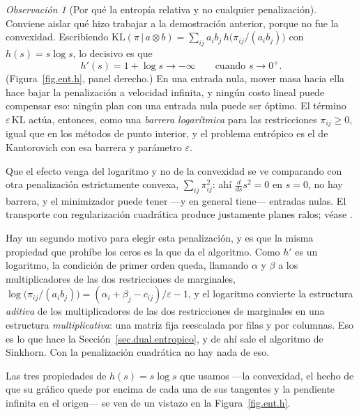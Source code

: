\documentclass[12pt, a4paper]{amsbook}
\theoremstyle{remark}
\newtheorem{obs}[teo]{Observación}
\theoremstyle{definition}
\numberwithin{section}{chapter}
\numberwithin{subsection}{section}
\numberwithin{equation}{section}
\numberwithin{figure}{chapter}
\begin{document}
\begin{obs}[Por qué la entropía relativa y no cualquier penalización]\label{obs.por.que.KL}
Conviene aislar qué hizo trabajar a la demostración anterior, porque no fue
la convexidad. Escribiendo
$\mathrm{KL}(\pi\,|\,a\otimes b)=\sum_{ij}a_ib_j\,h\bigl(\pi_{ij}/(a_ib_j)\bigr)$
con $h(s)=s\log s$, lo decisivo es que
\[
h'(s)=1+\log s\longrightarrow-\infty\qquad\text{cuando }s\to0^+ .
\]
(Figura~\ref{fig.ent.h}, panel derecho.)
En una entrada nula, mover masa hacia ella hace bajar la penalización a
velocidad infinita, y ningún costo lineal puede compensar eso: ningún plan
con una entrada nula puede ser óptimo. El término
$\varepsilon\,\mathrm{KL}$ actúa, entonces, como una \emph{barrera
logarítmica} para las restricciones $\pi_{ij}\ge0$, igual que en los métodos
de punto interior, y el problema entrópico es el de Kantorovich con esa
barrera y parámetro $\varepsilon$.

Que el efecto venga del logaritmo y no de la convexidad se ve comparando con
otra penalización estrictamente convexa, $\sum_{ij}\pi_{ij}^2$: ahí
$\frac{d}{ds}s^2=0$ en $s=0$, no hay barrera, y el minimizador puede tener
—y en general tiene— entradas nulas. El transporte con regularización
cuadrática produce justamente planes ralos; véase
\cite{BlondelSeguyRolet2018}.

Hay un segundo motivo para elegir esta penalización, y es que la misma
propiedad que prohíbe los ceros es la que da el algoritmo. Como $h'$ es un
logaritmo, la condición de primer orden queda, llamando $\alpha$ y $\beta$ a
los multiplicadores de las dos restricciones de marginales,
$\log\bigl(\pi_{ij}/(a_ib_j)\bigr)=(\alpha_i+\beta_j-c_{ij})/\varepsilon-1$,
y el logaritmo convierte la estructura \emph{aditiva} de los multiplicadores
de las dos restricciones de marginales en una estructura
\emph{multiplicativa}: una matriz fija reescalada por filas y por columnas.
Eso es lo que hace la Sección~\ref{sec.dual.entropico}, y de ahí sale el
algoritmo de Sinkhorn. Con la penalización cuadrática no hay nada de eso.
\end{obs}

Las tres propiedades de $h(s)=s\log s$ que usamos —la convexidad, el hecho de
que su gráfico quede por encima de cada una de sus tangentes y la pendiente
infinita en el origen— se ven de un vistazo en la Figura~\ref{fig.ent.h}.
\end{document}
